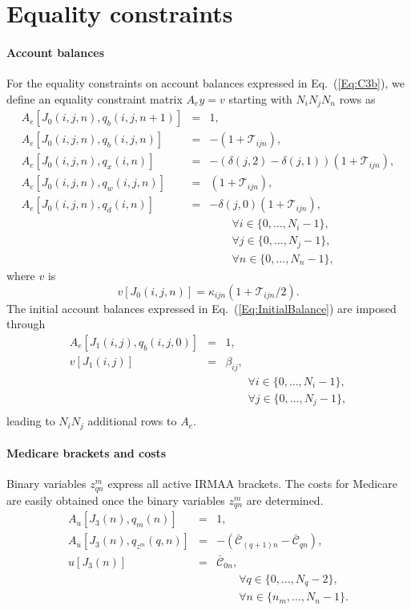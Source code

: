 \documentclass{report}[fleqn,11pt]
\begin{document}
\section{Equality constraints}

\paragraph*{Account balances}
For the equality constraints on account balances expressed in Eq.~(\ref{Eq:C3b}),
we define an equality constraint matrix $A_ey = v$ starting
with $N_iN_jN_n$ rows as
\begin{eqnarray}
	\label{Eq:B1}
	A_e[J_0(i, j, n), q_b(i, j, n+1)] &=& 1, \nonumber \\
	A_e[J_0(i, j, n), q_b(i, j, n)] &=& -(1 + \mathcal{T}_{ijn}), \nonumber \\
	A_e[J_0(i, j, n), q_x(i, n)] &=& -(\delta(j, 2) - \delta(j, 1))(1 + \mathcal{T}_{ijn}), \nonumber \\
	A_e[J_0(i, j, n), q_w(i, j, n)] &=& (1 + \mathcal{T}_{ijn}), \nonumber \\
	A_e[J_0(i, j, n), q_d(i, n)] &=& -\delta(j, 0)(1 + \mathcal{T}_{ijn}), \\
	&&\qquad\forall i \in \{0,\ldots, N_i-1\},\nonumber\\
	&&\qquad\forall j \in \{0,\ldots, N_j-1\},\nonumber\\
	&&\qquad\forall n \in \{0,\ldots, N_n-1\}, \nonumber
\end{eqnarray}
where $v$ is
\begin{equation}
	v[J_0(i, j, n)] = \kappa_{ijn}(1 + \mathcal{T}_{ijn}/2).
\end{equation}
The initial account balances expressed in Eq.~(\ref{Eq:InitialBalance}) are imposed through
\begin{eqnarray}
	A_e[J_1(i, j), q_b(i, j, 0)] &=& 1, \nonumber \\
	v[J_1(i, j)] &=& \beta_{ij},  \\
	&&\qquad\forall i \in \{0,\ldots, N_i-1\},\nonumber\\
	&&\qquad\forall j \in \{0,\ldots, N_j-1\},\nonumber\\
\end{eqnarray}
leading to $N_i N_j$ additional rows to $A_e$.

\paragraph*{Medicare brackets and costs}
Binary variables $z_{qn}^m$ express
all active IRMAA brackets.
The costs for Medicare are easily obtained once the binary variables
$z^m_{qn}$ are determined.
\begin{eqnarray}
	A_u[J_3(n), q_{m}(n)] &=& 1, \nonumber \\
	A_u[J_3(n), q_{z^m}(q, n)] &=& -(\bar{\mathcal{C}}_{(q+1)n} - \bar{\mathcal{C}}_{qn}), \nonumber \\
	u[J_3(n)] &=& \bar{\mathcal{C}}_{0n},\\
	&&\qquad\forall q \in \{0,\ldots, N_q - 2\}, \nonumber\\
	&&\qquad\forall n \in \{n_m,\ldots, N_n - 1\}.\nonumber
\end{eqnarray}
\end{document}
